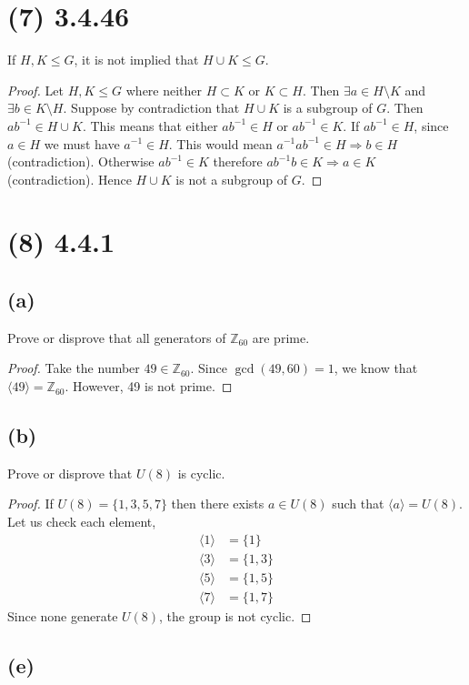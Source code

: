 \documentclass{article}
\begin{document}
\section*{(7) 3.4.46}
If $H,K \leq G$, it is not implied that $H \cup K \leq G$.
\begin{proof}
    Let $H,K \leq G$ where neither $H \subset K$ or $K \subset H$.
    Then $\exists a \in H \setminus K$ and $\exists b \in K \setminus H$.
    Suppose by contradiction that $H \cup K$ is a subgroup of $G$.
    Then $ab^{-1} \in H \cup K$.
    This means that either $ab^{-1} \in H$ or $ab^{-1} \in K$.
    If $ab^{-1} \in H$, since $a \in H$ we must have $a^{-1} \in H$.
    This would mean $a^{-1}ab^{-1} \in H \Longrightarrow b \in H$ (contradiction).
    Otherwise $ab^{-1} \in K$ therefore $ab^{-1}b \in K \Longrightarrow a \in K$ (contradiction).
    Hence $H \cup K$ is not a subgroup of $G$.
\end{proof}
\section*{(8) 4.4.1}
\subsection*{(a)}
Prove or disprove that all generators of $\mathbb{Z}_{60}$ are prime.
\begin{proof}
    Take the number $49 \in \mathbb{Z}_{60}$.
    Since $\gcd(49,60) = 1$, we know that $\langle 49 \rangle = \mathbb{Z}_{60}$.
    However, 49 is not prime.
\end{proof}
\subsection*{(b)}
Prove or disprove that $U(8)$ is cyclic.
\begin{proof}
    If $U(8) = \{1,3,5,7\}$ then there exists $a \in U(8)$ such that $\langle a \rangle = U(8)$.
    Let us check each element,
    \begin{align*}
        \langle 1 \rangle & = \{ 1 \} \\
        \langle 3 \rangle & = \{1, 3\} \\
        \langle 5 \rangle & = \{1,5\}\\
        \langle 7 \rangle & = \{1,7\}
    \end{align*}
    Since none generate $U(8)$, the group is not cyclic.
\end{proof}
\subsection*{(e)}
\end{document}
